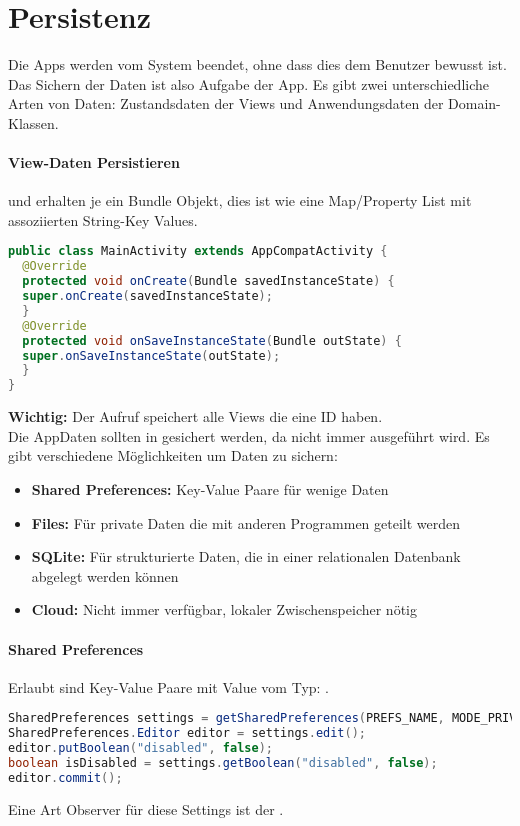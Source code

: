 \section{Persistenz}
Die Apps werden vom System beendet, ohne dass dies dem Benutzer bewusst ist. Das Sichern der Daten ist also Aufgabe der App. Es gibt zwei unterschiedliche Arten von Daten: Zustandsdaten der Views und Anwendungsdaten der Domain-Klassen.
\paragraph{View-Daten Persistieren}  und  erhalten je ein Bundle Objekt, dies ist wie eine Map/Property List mit assoziierten String-Key Values.
\begin{lstlisting}[language=java]
public class MainActivity extends AppCompatActivity {
  @Override
  protected void onCreate(Bundle savedInstanceState) {
  super.onCreate(savedInstanceState);
  }
  @Override
  protected void onSaveInstanceState(Bundle outState) {
  super.onSaveInstanceState(outState);
  }
}
\end{lstlisting}
\textbf{Wichtig:} Der  Aufruf speichert alle Views die eine ID haben.\\
Die AppDaten sollten in  gesichert werden, da  nicht immer ausgeführt wird. Es gibt verschiedene Möglichkeiten um Daten zu sichern:
\begin{itemize}
\item \textbf{Shared Preferences:} Key-Value Paare für wenige Daten
\item \textbf{Files:} Für private Daten die mit anderen Programmen geteilt werden
\item \textbf{SQLite:} Für strukturierte Daten, die in einer relationalen Datenbank abgelegt werden können
\item \textbf{Cloud:} Nicht immer verfügbar, lokaler Zwischenspeicher nötig
\end{itemize}
\paragraph{Shared Preferences} Erlaubt sind Key-Value Paare mit Value vom Typ: . 
\begin{lstlisting}[language=java]
SharedPreferences settings = getSharedPreferences(PREFS_NAME, MODE_PRIVATE);
SharedPreferences.Editor editor = settings.edit();
editor.putBoolean("disabled", false);
boolean isDisabled = settings.getBoolean("disabled", false);
editor.commit();
\end{lstlisting}
Eine Art Observer für diese Settings ist der .
